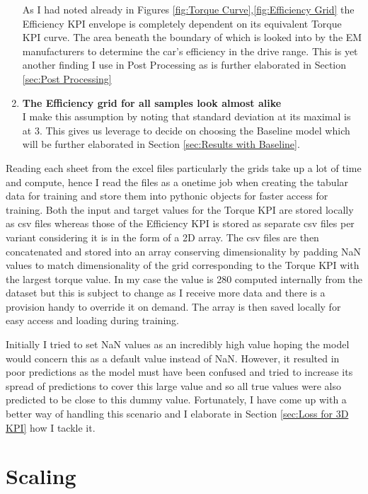 \documentclass{report} %
\begin{document}
\begin{enumerate}[nosep]
    As I had noted already in Figures \ref{fig:Torque Curve},\ref{fig:Efficiency Grid} the Efficiency \ac{KPI} envelope is completely dependent on its equivalent 
    Torque \ac{KPI} curve. The area beneath the boundary of which is looked into by the \ac{EM} manufacturers to determine the car's efficiency in the drive range.
    This is yet another finding I use in Post Processing as is further elaborated in Section \ref{sec:Post Processing}
    \item \textbf{The Efficiency grid for all samples look almost alike} \\
    I make this assumption by noting that standard deviation at its maximal is at 3. This gives us leverage to decide on choosing the Baseline model which will 
    be further elaborated in Section \ref{sec:Results with Baseline}.
\end{enumerate}


Reading each sheet from the excel files particularly the grids take up a lot of time and compute, hence I read the files as a onetime job when creating the 
tabular data for training  and store them into pythonic objects for faster access for training.
Both the input and target values for the Torque \ac{KPI} are stored locally as csv files whereas those of the Efficiency \ac{KPI} is stored as separate csv files per 
variant considering it is in the form of a 2\ac{D} array.
The csv files are then concatenated and stored into an array conserving dimensionality by padding \ac{NaN} values to match dimensionality of the grid 
corresponding to the Torque \ac{KPI} with the largest torque value.
In my case the value is 280 computed internally from the dataset but this is subject to change as I receive more data and there is a provision handy to override it 
on demand. The array is then saved locally for easy access and loading during training.

Initially I tried to set \ac{NaN} values as an incredibly high value hoping the model would concern this as a default value instead of \ac{NaN}.
However, it resulted in poor predictions as the model must have been confused and tried to increase its spread of predictions to cover this large value and so all 
true values were also predicted to be close to this dummy value.
Fortunately, I have come up with a better way of handling this scenario and I elaborate in Section \ref{sec:Loss for 3D KPI} how I tackle it.

\section{Scaling}\label{sec:Scaling}
\end{document}
